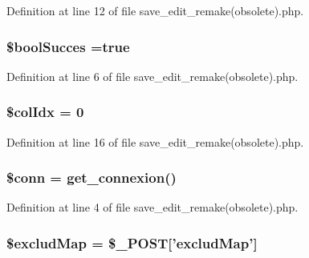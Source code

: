 Definition at line 12 of file save\-\_\-edit\-\_\-remake(obsolete).\-php.

\hypertarget{save__edit__remake_07obsolete_08_8php_a538eaf07e91a8c4f140bc04fa2b899cf}{
\subsubsection[{\$bool\-Succes}]{\setlength{\rightskip}{0pt plus 5cm}\$bool\-Succes ={\bf true}}}\label{save__edit__remake_07obsolete_08_8php_a538eaf07e91a8c4f140bc04fa2b899cf}


Definition at line 6 of file save\-\_\-edit\-\_\-remake(obsolete).\-php.

\hypertarget{save__edit__remake_07obsolete_08_8php_a2efb2f950a559a8fda8c5b114c5ea10f}{
\subsubsection[{\$col\-Idx}]{\setlength{\rightskip}{0pt plus 5cm}\$col\-Idx = 0}}\label{save__edit__remake_07obsolete_08_8php_a2efb2f950a559a8fda8c5b114c5ea10f}


Definition at line 16 of file save\-\_\-edit\-\_\-remake(obsolete).\-php.

\hypertarget{save__edit__remake_07obsolete_08_8php_aa8a5a87b9c1a6a0819b88447cbe41877}{
\subsubsection[{\$conn}]{\setlength{\rightskip}{0pt plus 5cm}\$conn = {\bf get\-\_\-connexion}()}}\label{save__edit__remake_07obsolete_08_8php_aa8a5a87b9c1a6a0819b88447cbe41877}


Definition at line 4 of file save\-\_\-edit\-\_\-remake(obsolete).\-php.

\hypertarget{save__edit__remake_07obsolete_08_8php_a296195c83717b71c16843c3c951e29a2}{
\subsubsection[{\$exclud\-Map}]{\setlength{\rightskip}{0pt plus 5cm}\$exclud\-Map = \$\-\_\-\-P\-O\-S\-T\mbox{[}'exclud\-Map'\mbox{]}}}\label{save__edit__remake_07obsolete_08_8php_a296195c83717b71c16843c3c951e29a2}



